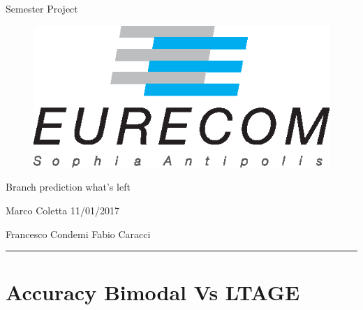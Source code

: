 \documentclass[10pt,a4paper]{article}
\begin{document}
\begin{center}

\huge{Semester Project}\\

\begin{figure}[!htb]
\centering
\includegraphics[scale=.7]{EURECOM.eps}
\end{figure}

\begin{huge}
Branch prediction what's left\\
\end{huge} 
\begin{large}
Marco Coletta 
\hspace{301pt}
11/01/2017
\begin{flushleft}
Francesco Condemi
\hspace{400pt}
Fabio Caracci
\end{flushleft} 
\end{large}
\rule{\textwidth}{0.5mm}
\end{center}

\section{Accuracy Bimodal Vs LTAGE}

\begin{figure}[!htb]
\centering
{}
\end{figure}
\end{document}
